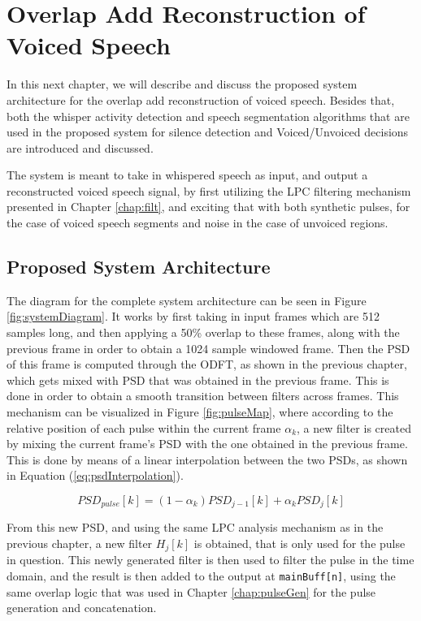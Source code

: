 \chapter{Overlap Add Reconstruction of Voiced Speech} \label{chap:overlapAdd}

In this next chapter, we will describe and discuss the proposed system architecture for the overlap add reconstruction of voiced speech. Besides that, both the whisper activity detection and speech segmentation algorithms that are used in the proposed system for silence detection and Voiced/Unvoiced decisions are introduced and discussed.

The system is meant to take in whispered speech as input, and output a reconstructed voiced speech signal, by first utilizing the LPC filtering mechanism presented in Chapter \ref{chap:filt}, and exciting that with both synthetic pulses, for the case of voiced speech segments and noise in the case of unvoiced regions. 

\section{Proposed System Architecture}

The diagram for the complete system architecture can be seen in Figure \ref{fig:systemDiagram}. It works by first taking in input frames which are 512 samples long, and then applying a 50\% overlap to these frames, along with the previous frame in order to obtain a 1024 sample windowed frame. Then the PSD of this frame is computed through the ODFT, as shown in the previous chapter, which gets mixed with PSD that was obtained in the previous frame. This is done in order to obtain a smooth transition between filters across frames. This mechanism can be visualized in Figure \ref{fig:pulseMap}, where according to the relative position of each pulse within the current frame $\alpha_k$, a new filter is created by mixing the current frame's PSD with the one obtained in the previous frame. This is done by means of a linear interpolation between the two PSDs, as shown in Equation (\ref{eq:psdInterpolation}).

\begin{equation}
    PSD_{pulse}[k] = (1-\alpha_k) PSD_{j-1}[k] + \alpha_k PSD_j[k]
    \label{eq:psdInterpolation}
\end{equation}

From this new PSD, and using the same LPC analysis mechanism as in the previous chapter, a new filter $H_j[k]$ is obtained, that is only used for the pulse in question. This newly generated filter is then used to filter the pulse in the time domain, and the result is then added to the output at \texttt{mainBuff[n]}, using the same overlap logic that was used in Chapter \ref{chap:pulseGen} for the pulse generation and concatenation. 

